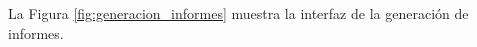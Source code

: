La Figura \ref{fig:generacion_informes} muestra la interfaz de la generación de informes.

\begin{figure}[h!]
    \centering
\end{figure}













